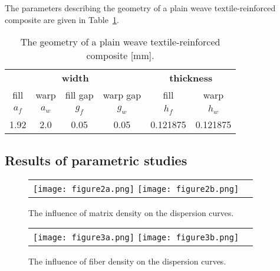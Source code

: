 \documentclass[]{spie}  %
\begin{document}
The parameters describing the geometry of a plain weave textile-reinforced composite 
are given in Table~\ref{tab:weave_geo}. 
\begin{table}[ht]
	\renewcommand{\arraystretch}{1.3}
	\caption{The geometry of a plain weave textile-reinforced composite [mm].}
	\label{tab:weave_geo}
	\begin{center}
		\begin{tabular}{cccccc} 
			\toprule
			\multicolumn{4}{c}{\textbf{width} }	& \multicolumn{2}{c}{\textbf{thickness} }  \\ 
			\cmidrule(lr){1-4} \cmidrule(lr){5-6} 
			fill & warp & fill gap& warp gap& fill & warp\\
			\(a_f\) &\(a_w\)& \(g_f\)  & \(g_w\)  & \(h_f\)& \(h_w\) \\ 
			\cmidrule(lr){1-2} \cmidrule(lr){3-4} \cmidrule(lr){5-6}
			1.92 &2.0& 0.05& 0.05 & 0.121875 & 0.121875 \\
			\bottomrule 
		\end{tabular} 
	\end{center}
\end{table}

\subsection{Results of parametric studies}

\begin{figure} [ht]
	\begin{center}
		\begin{tabular}{cc} %
			\texttt{[image: figure2a.png]}
			\texttt{[image: figure2b.png]}
		\end{tabular}
	\end{center}
	\caption[] 
	{ \label{fig:rhom} 
		The influence of matrix density on the dispersion curves.}
\end{figure} 

\begin{figure} [ht]
	\begin{center}
		\begin{tabular}{cc} %
			\texttt{[image: figure3a.png]}
			\texttt{[image: figure3b.png]}
		\end{tabular}
	\end{center}
	\caption[] 
	{ \label{fig:rhof} 
		The influence of fiber density on the dispersion curves.}
\end{figure} 
\end{document}
